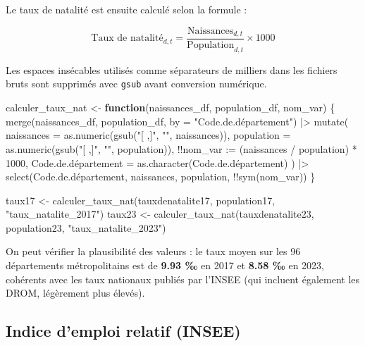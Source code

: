 \documentclass[
  letterpaper,
  DIV=11,
  numbers=noendperiod]{scrartcl}
\newenvironment{Shaded}{\begin{snugshade}}{\end{snugshade}}
\newcommand{\AttributeTok}[1]{\textcolor[rgb]{0.40,0.45,0.13}{#1}}
\newcommand{\ControlFlowTok}[1]{\textcolor[rgb]{0.00,0.23,0.31}{\textbf{#1}}}
\newcommand{\DecValTok}[1]{\textcolor[rgb]{0.68,0.00,0.00}{#1}}
\newcommand{\FunctionTok}[1]{\textcolor[rgb]{0.28,0.35,0.67}{#1}}
\newcommand{\NormalTok}[1]{\textcolor[rgb]{0.00,0.23,0.31}{#1}}
\newcommand{\OtherTok}[1]{\textcolor[rgb]{0.00,0.23,0.31}{#1}}
\newcommand{\SpecialCharTok}[1]{\textcolor[rgb]{0.37,0.37,0.37}{#1}}
\newcommand{\StringTok}[1]{\textcolor[rgb]{0.13,0.47,0.30}{#1}}
\begin{document}
Le taux de natalité est ensuite calculé selon la formule :

\[\text{Taux de natalité}_{d,t} = \frac{\text{Naissances}_{d,t}}{\text{Population}_{d,t}} \times 1000\]

Les espaces insécables utilisés comme séparateurs de milliers dans les
fichiers bruts sont supprimés avec \texttt{gsub} avant conversion
numérique.

\begin{Shaded}
\begin{Highlighting}[]
\NormalTok{calculer\_taux\_nat }\OtherTok{\textless{}{-}} \ControlFlowTok{function}\NormalTok{(naissances\_df, population\_df, nom\_var) \{}
  \FunctionTok{merge}\NormalTok{(naissances\_df, population\_df, }\AttributeTok{by =} \StringTok{"Code.de.département"}\NormalTok{) }\SpecialCharTok{|\textgreater{}}
    \FunctionTok{mutate}\NormalTok{(}
      \AttributeTok{naissances =} \FunctionTok{as.numeric}\NormalTok{(}\FunctionTok{gsub}\NormalTok{(}\StringTok{"[ ,]"}\NormalTok{, }\StringTok{""}\NormalTok{, naissances)),}
      \AttributeTok{population =} \FunctionTok{as.numeric}\NormalTok{(}\FunctionTok{gsub}\NormalTok{(}\StringTok{"[ ,]"}\NormalTok{, }\StringTok{""}\NormalTok{, population)),}
      \SpecialCharTok{!!}\AttributeTok{nom\_var  :=}\NormalTok{ (naissances }\SpecialCharTok{/}\NormalTok{ population) }\SpecialCharTok{*} \DecValTok{1000}\NormalTok{,}
\NormalTok{      Code.de.département }\OtherTok{=} \FunctionTok{as.character}\NormalTok{(Code.de.département)}
\NormalTok{    ) }\SpecialCharTok{|\textgreater{}}
    \FunctionTok{select}\NormalTok{(Code.de.département, naissances, population, }\SpecialCharTok{!!}\FunctionTok{sym}\NormalTok{(nom\_var))}
\NormalTok{\}}

\NormalTok{taux17 }\OtherTok{\textless{}{-}} \FunctionTok{calculer\_taux\_nat}\NormalTok{(tauxdenatalite17, population17, }\StringTok{"taux\_natalite\_2017"}\NormalTok{)}
\NormalTok{taux23 }\OtherTok{\textless{}{-}} \FunctionTok{calculer\_taux\_nat}\NormalTok{(tauxdenatalite23, population23, }\StringTok{"taux\_natalite\_2023"}\NormalTok{)}
\end{Highlighting}
\end{Shaded}

On peut vérifier la plausibilité des valeurs : le taux moyen sur les 96
départements métropolitains est de \textbf{9.93 ‰} en 2017 et
\textbf{8.58 ‰} en 2023, cohérents avec les taux nationaux publiés par
l'INSEE (qui incluent également les DROM, légèrement plus élevés).

\subsection{Indice d'emploi relatif
(INSEE)}\label{indice-demploi-relatif-insee}
\end{document}
